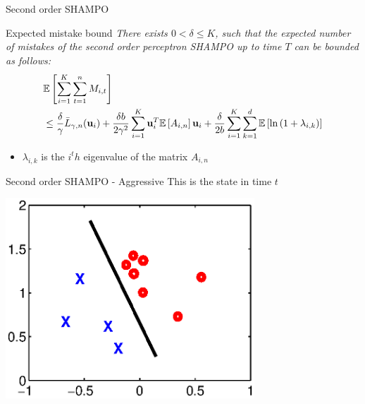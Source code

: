\documentclass{beamer}
\begin{document}
\begin{frame}{Second order SHAMPO}
\begin{block}{Expected mistake bound}
\emph{There exists $0<\delta\le K$, such that the  expected number of mistakes  of the second order perceptron SHAMPO  up to time $T$ can be bounded as follows:}
  \begin{equation*}
  \begin{split}
   &\mathbb{E}\left[{\sum_{i=1}^{K}\sum_{t=1}^{n}{M_{i,t}}}\right] \\
   &\le \frac{\delta}{\gamma}{\bar L}_{\gamma,n}(\mathbf{u}_{i})
+ \frac{\delta b}{2\gamma^2}\sum_{i=1}^{K}\mathbf{u}_i^T\mathbb{E}\left[{A_{i,n}}\right]\mathbf{u}_i+ 
\frac{\delta}{2b}\sum_{i=1}^{K}\sum_{k=1}^{d}\mathbb{E}\left[{\ln\left({1+\lambda_{i,k}}\right)}\right]
\end{split}
\end{equation*} 
\end{block}

\begin{itemize}
  \item  $\lambda_{i,k}$ is the $i^th$ eigenvalue of the matrix $A_{i,n}$
\end{itemize}

\end{frame}

\begin{frame}{Second order SHAMPO - Aggressive}
This is the state in time $t$
\begin{center}
\includegraphics[width=0.7\textwidth]{figs/confidence.eps}
\end{center}
\end{frame}
\end{document}
